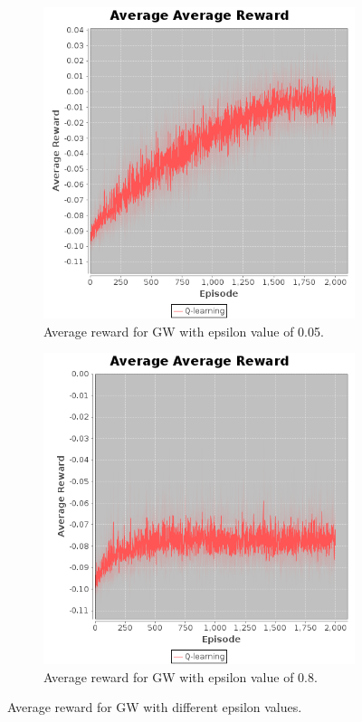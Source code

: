 \documentclass[10pt, twocolumn]{article}
\begin{document}
			\begin{figure}[]
				\centering
				\begin{subfigure}[t]{0.24\textwidth}
					\centering
					\includegraphics[width=\textwidth]{../graphics/GridWorld_0.05_E_rewards.png}
					\caption{Average reward for GW with epsilon value of 0.05.}
					\label{fig:GW:epsilon1}
				\end{subfigure}
				\begin{subfigure}[t]{0.24\textwidth}
					\centering
					\includegraphics[width=\textwidth]{../graphics/GridWorld_0.8_E_rewards.png}
					\caption{Average reward for GW with epsilon value of 0.8.}
					\label{fig:GW:epsilon2}
				\end{subfigure}
				\caption{Average reward for GW with different epsilon values.}
				\label{fig:GW:aepsilon}
			\end{figure}
\end{document}
